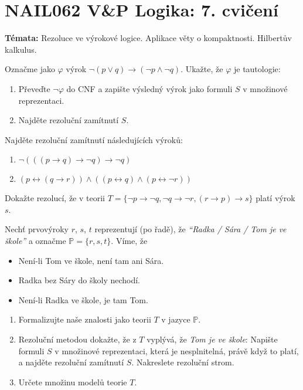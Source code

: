 \documentclass[a4paper,12pt]{article}
\begin{document}
\section*{NAIL062 V\&P Logika: 7. cvičení}


\textbf{Témata:}
Rezoluce ve výrokové logice. Aplikace věty o kompaktnosti. Hilbertův kalkulus.


\medskip\begin{problem}
    Označme jako $\varphi$ výrok $\neg (p \vee q) \to (\neg p \wedge \neg q)$. Ukažte, že $\varphi$ je tautologie:
    \begin{enumerate}
        \item Převeďte $\neg \varphi$ do CNF a zapište výsledný výrok jako formuli $S$ v množinové reprezentaci.
        \item Najděte rezoluční zamítnutí $S$.
    \end{enumerate}
    \end{problem}
    
    
    \medskip\begin{problem}
    Najděte rezoluční zamítnutí následujících výroků:
    \begin{enumerate}
        \item $\neg(((p\to q)\to \neg q)\to \neg q)$
        \item $(p\leftrightarrow (q\to r))\wedge((p\leftrightarrow q)\wedge(p\leftrightarrow \neg r))$
        
    \end{enumerate}
    \end{problem}
        
        
    \medskip\begin{problem}
    Dokažte rezolucí, že v teorii $T=\{\neg p \to \neg q,\neg q \to \neg r, (r\to p)\to s\}$ platí výrok $s$.
    \end{problem}
    
    
    \medskip\begin{problem}Nechť prvovýroky $r$, $s$, $t$  reprezentují (po řadě), že \emph{``Radka / Sára / Tom je ve škole''} a označme $\mathbb{P}=\{r,s,t\}$. Víme, že
        \begin{itemize}\it
        \item Není-li Tom ve škole, není tam ani Sára.
        \item Radka bez Sáry do školy nechodí.
        \item Není-li Radka ve škole, je tam Tom.
        \end{itemize}
        \begin{enumerate}
        \item Formalizujte naše znalosti jako teorii $T$ v jazyce $\mathbb P$.
        \item Rezoluční metodou dokažte, že z $T$ vyplývá, že \emph{Tom je ve škole}: Napište formuli $S$ v množinové reprezentaci, která je nesplnitelná, právě když to platí, a najděte rezoluční zamítnutí $S$. Nakreslete rezoluční strom.
        \item Určete množinu modelů teorie $T$.
        \end{enumerate}
    \end{problem}
    
\end{document}
